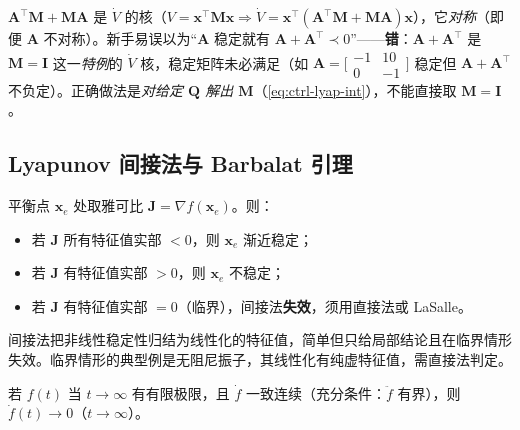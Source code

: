 \begin{pitfall}
$\mathbf{A}^\top\mathbf{M}+\mathbf{M}\mathbf{A}$ 是 $\dot V$ 的核（$V=\mathbf{x}^\top\mathbf{M}\mathbf{x}\Rightarrow\dot V=\mathbf{x}^\top(\mathbf{A}^\top\mathbf{M}+\mathbf{M}\mathbf{A})\mathbf{x}$），它\emph{对称}（即便 $\mathbf{A}$ 不对称）。新手易误以为“$\mathbf{A}$ 稳定就有 $\mathbf{A}+\mathbf{A}^\top\prec0$”——\textbf{错}：$\mathbf{A}+\mathbf{A}^\top$ 是 $\mathbf{M}=\mathbf{I}$ 这一\emph{特例}的 $\dot V$ 核，稳定矩阵未必满足（如 $\mathbf{A}=\big[\begin{smallmatrix}-1&10\\0&-1\end{smallmatrix}\big]$ 稳定但 $\mathbf{A}+\mathbf{A}^\top$ 不负定）。正确做法是\emph{对给定 $\mathbf{Q}$ 解出 $\mathbf{M}$}（\cref{eq:ctrl-lyap-int}），不能直接取 $\mathbf{M}=\mathbf{I}$。
\end{pitfall}

\subsection{Lyapunov 间接法与 Barbalat 引理}
\label{sec:ctrl-indirect}

\begin{theorem}
\label{thm:ctrl-indirect}
平衡点 $\mathbf{x}_e$ 处取雅可比 $\mathbf{J}=\nabla f(\mathbf{x}_e)$。则\cite{khalil2002nonlinear}：
\begin{itemize}
  \item 若 $\mathbf{J}$ 所有特征值实部 $<0$，则 $\mathbf{x}_e$ 渐近稳定；
  \item 若 $\mathbf{J}$ 有特征值实部 $>0$，则 $\mathbf{x}_e$ 不稳定；
  \item 若 $\mathbf{J}$ 有特征值实部 $=0$（临界），间接法\textbf{失效}，须用直接法或 LaSalle。
\end{itemize}
\end{theorem}

间接法把非线性稳定性归结为线性化的特征值，简单但只给局部结论且在临界情形失效。临界情形的典型例是无阻尼振子，其线性化有纯虚特征值，需直接法判定。

\begin{lemma}[Barbalat 引理]
\label{lem:ctrl-barbalat}
若 $f(t)$ 当 $t\to\infty$ 有有限极限，且 $\dot f$ 一致连续（充分条件：$\ddot f$ 有界），则 $\dot f(t)\to0$（$t\to\infty$）\cite{khalil2002nonlinear}。
\end{lemma}

